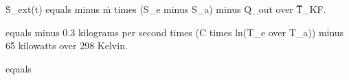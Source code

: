 Ṡ_ext(t) equals minus ṁ times (S_e minus S_a) minus Q̇_out over T̅_KF.  

equals minus 0.3 kilograms per second times (C times ln(T_e over T_a)) minus 65 kilowatts over 298 Kelvin.  

equals
